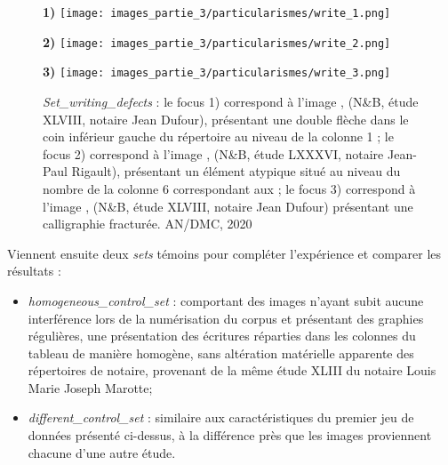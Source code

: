 \newpage
\begin{figure}[H]
    \begin{minipage}[c]{.46\linewidth} 
        \centering
        \textbf{1)}
        \texttt{[image: images\_partie\_3/particularismes/write\_1.png]}
        \end{minipage}
    \hfill%
    \begin{minipage}[c]{.46\linewidth}
        \centering
        \textbf{2)}
        \texttt{[image: images\_partie\_3/particularismes/write\_2.png]}
    \end{minipage}
    \hfill%
    \begin{minipage}[c]{.46\linewidth}
        \centering
        \textbf{3)}
        \texttt{[image: images\_partie\_3/particularismes/write\_3.png]}
    \end{minipage}
        \caption{\textit{Set\_writing\_defects} : le focus 1) correspond à l'image , (N\&B, étude XLVIII, notaire Jean Dufour), présentant une double flèche dans le coin inférieur gauche du répertoire au niveau de la colonne 1 ; le focus 2) correspond à l'image , (N\&B, étude LXXXVI, notaire Jean-Paul Rigault),  présentant un élément atypique situé au niveau du nombre  de la colonne 6 correspondant aux ; le focus 3) correspond à l'image
        , (N\&B, étude XLVIII, notaire Jean Dufour) présentant une calligraphie fracturée.
        \textcopyright AN/DMC, 2020}
    \label{fig:exemples_write}
\end{figure}
\newpage    
Viennent ensuite deux \textit{sets} témoins pour compléter l'expérience et comparer les résultats :

\begin{itemize}
    \item \textit{homogeneous\_control\_set} : comportant des images n'ayant subit aucune interférence lors de la numérisation du corpus et présentant des graphies régulières, une présentation des écritures réparties dans les colonnes du tableau de manière homogène, sans altération matérielle apparente des répertoires de notaire, provenant de la même étude XLIII du notaire Louis Marie Joseph Marotte; 
    \item \textit{different\_control\_set} : similaire aux caractéristiques du premier jeu de données présenté ci-dessus, à la différence près que les images proviennent chacune d'une autre étude. 
\end{itemize}

